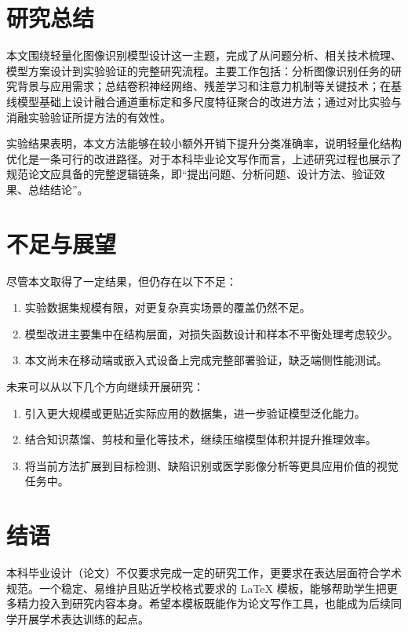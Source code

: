 \section{研究总结}

本文围绕轻量化图像识别模型设计这一主题，完成了从问题分析、相关技术梳理、模型方案设计到实验验证的完整研究流程。主要工作包括：分析图像识别任务的研究背景与应用需求；总结卷积神经网络、残差学习和注意力机制等关键技术；在基线模型基础上设计融合通道重标定和多尺度特征聚合的改进方法；通过对比实验与消融实验验证所提方法的有效性。

实验结果表明，本文方法能够在较小额外开销下提升分类准确率，说明轻量化结构优化是一条可行的改进路径。对于本科毕业论文写作而言，上述研究过程也展示了规范论文应具备的完整逻辑链条，即“提出问题、分析问题、设计方法、验证效果、总结结论”。

\section{不足与展望}

尽管本文取得了一定结果，但仍存在以下不足：

\begin{enumerate}
  \item 实验数据集规模有限，对更复杂真实场景的覆盖仍然不足。
  \item 模型改进主要集中在结构层面，对损失函数设计和样本不平衡处理考虑较少。
  \item 本文尚未在移动端或嵌入式设备上完成完整部署验证，缺乏端侧性能测试。
\end{enumerate}

未来可以从以下几个方向继续开展研究：

\begin{enumerate}
  \item 引入更大规模或更贴近实际应用的数据集，进一步验证模型泛化能力。
  \item 结合知识蒸馏、剪枝和量化等技术，继续压缩模型体积并提升推理效率。
  \item 将当前方法扩展到目标检测、缺陷识别或医学影像分析等更具应用价值的视觉任务中。
\end{enumerate}

\section{结语}

本科毕业设计（论文）不仅要求完成一定的研究工作，更要求在表达层面符合学术规范。一个稳定、易维护且贴近学校格式要求的 LaTeX 模板，能够帮助学生把更多精力投入到研究内容本身。希望本模板既能作为论文写作工具，也能成为后续同学开展学术表达训练的起点。
